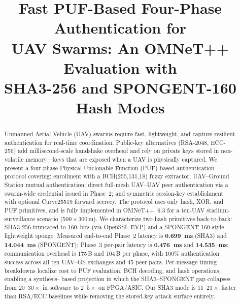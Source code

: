 \documentclass[conference,a4paper,10pt]{IEEEtran}
\begin{document}
\title{Fast PUF-Based Four-Phase Authentication for\\
UAV Swarms: An OMNeT++ Evaluation with\\
SHA3-256 and SPONGENT-160 Hash Modes}

\author{%
\and
{}
}

\maketitle

\begin{abstract}
Unmanned Aerial Vehicle (UAV) swarms require fast, lightweight, and
capture-resilient authentication for real-time coordination.
Public-key alternatives (RSA-2048, ECC-256) add millisecond-scale
handshake overhead and rely on private keys stored in non-volatile
memory---keys that are exposed when a UAV is physically captured.
We present a four-phase Physical Unclonable Function (PUF)-based
authentication protocol covering: enrollment with a BCH(255,131,18)
fuzzy extractor; UAV--Ground Station mutual authentication; direct
full-mesh UAV--UAV peer authentication via a swarm-wide credential
issued in Phase~2; and symmetric session-key establishment with
optional Curve25519 forward secrecy. The protocol uses only hash,
XOR, and PUF primitives, and is fully implemented in OMNeT++~6.3 for
a ten-UAV stadium-surveillance scenario ($500{\times}300$\,m). We
characterize two hash primitives back-to-back: SHA3-256 truncated to
160~bits (via OpenSSL EVP) and a SPONGENT-160-style lightweight
sponge. Measured end-to-end Phase~2 latency is
\textbf{0.699~ms} (SHA3) and \textbf{14.044~ms} (SPONGENT);
Phase~3 per-pair latency is \textbf{0.476~ms} and \textbf{14.535~ms};
communication overhead is 175\,B and 104\,B per phase, with
$100\%$ authentication success across all ten UAV--GS exchanges and
$45$ peer pairs. Per-message timing breakdowns localize cost to PUF
evaluation, BCH decoding, and hash operations, enabling a synthesis-
based projection in which the SHA3--SPONGENT gap collapses from
$20$--$30\times$ in software to $2$--$5\times$ on FPGA/ASIC. Our
SHA3 mode is $11$--$21\times$ faster than RSA/ECC baselines while
removing the stored-key attack surface entirely.
\end{abstract}
\end{document}
